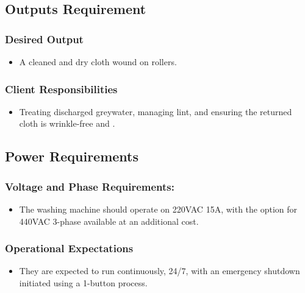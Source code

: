 \documentclass[table,french,english]{rapportCS}
\begin{document}
\subsection{ Outputs Requirement}\label{sec:outputreq}
\subsubsection{Desired Output}\label{sec:desout}
    \begin{itemize}[label=$\bullet$]
      \item A cleaned and dry cloth wound on rollers.
    \end{itemize}
    
\subsubsection{Client Responsibilities}\label{sec:clientresp}
    \begin{itemize}[label=$\bullet$]
      \item Treating discharged greywater,  managing lint, and ensuring the returned cloth is wrinkle-free and .
    \end{itemize}

\subsection{ Power Requirements}\label{sec:powerreq}
\subsubsection{Voltage and Phase Requirements:}\label{sec: vnpreq}
    \begin{itemize}[label=$\bullet$]
      \item The washing machine should operate on 220VAC 15A, with the option for 440VAC 3-phase available at an additional cost.
    \end{itemize}
  
  \subsubsection{Operational Expectations}\label{sec: opexp}
    \begin{itemize}[label=$\bullet$]
      \item They are expected to run continuously, 24/7, with an emergency shutdown initiated using a 1-button process.
    \end{itemize}
\end{document}
